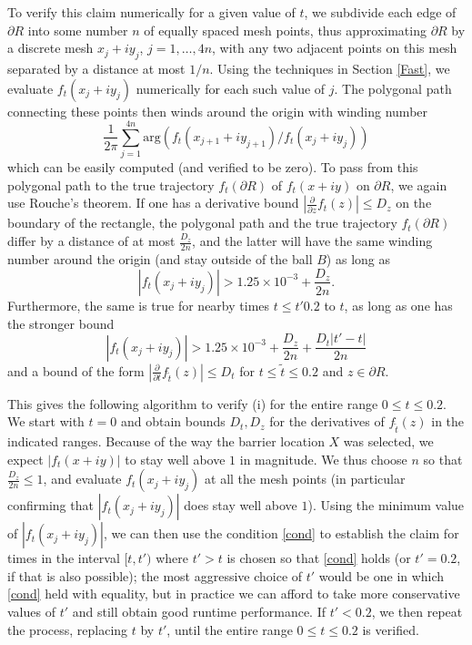 To verify this claim numerically for a given value of $t$, we subdivide each edge of $\partial R$ into some number $n$ of equally spaced mesh points, thus approximating $\partial R$ by a discrete mesh $x_j+iy_j$, $j=1,\dots,4n$, with any two adjacent points on this mesh separated by a distance at most $1/n$.  Using the techniques in Section \ref{Fast}, we evaluate $f_t(x_j+iy_j)$ numerically for each such value of $j$.  The polygonal path connecting these points then winds around the origin with winding number
$$ \frac{1}{2\pi} \sum_{j=1}^{4n} \mathrm{arg}( f_t(x_{j+1}+iy_{j+1}) / f_t(x_j + i y_j) )$$
which can be easily computed (and verified to be zero).  To pass from this polygonal path to the true trajectory $f_t(\partial R)$ of $f_t(x+iy)$ on $\partial R$, we again use Rouche's theorem.  If one has a derivative bound $|\frac{\partial}{\partial z} f_t(z)| \leq D_z$ on the boundary of the rectangle, the polygonal path and the true trajectory $f_t(\partial R)$ differ by a distance of at most $\frac{D_z}{2n}$, and the latter will have the same winding number around the origin (and stay outside of the ball $B$) as long as
$$ |f_t(x_j + iy_j)| > 1.25 \times 10^{-3} + \frac{D_z}{2n}.$$
Furthermore, the same is true for nearby times $t \leq t' 0.2$ to $t$, as long as one has the stronger bound
\begin{equation}\label{cond}
 |f_t(x_j + iy_j)| > 1.25 \times 10^{-3} + \frac{D_z}{2n} + \frac{D_t |t'-t|}{2n}
\end{equation}
and a bound of the form $|\frac{\partial}{\partial t} f_{\tilde t}(z)| \leq D_t$
for $t \leq \tilde t \leq 0.2$ and $z \in \partial R$.

This gives the following algorithm to verify (i) for the entire range $0 \leq t \leq 0.2$.  We start with $t=0$ and obtain bounds $D_t, D_z$ for the derivatives of $f_{\tilde t}(z)$ in the indicated ranges.  Because of the way the barrier location $X$ was selected, we expect $|f_t(x+iy)|$ to stay well above $1$ in magnitude.  We thus choose $n$ so that $\frac{D_z}{2n} \leq 1$, and evaluate $f_t(x_j+iy_j)$ at all the mesh points (in particular confirming that $|f_t(x_j+iy_j)|$ does stay well above $1$).  Using the minimum value of $|f_t(x_j+iy_j)|$, we can then use the condition \eqref{cond} to establish the claim for times in the interval $[t,t')$ where $t'>t$ is chosen so that \eqref{cond} holds (or $t'=0.2$, if that is also possible); the most aggressive choice of $t'$ would be one in which \eqref{cond} held with equality, but in practice we can afford to take more conservative values of $t'$ and still obtain good runtime performance.  If $t' < 0.2$, we then repeat the process, replacing $t$ by $t'$, until the entire range $0 \leq t \leq 0.2$ is verified.

